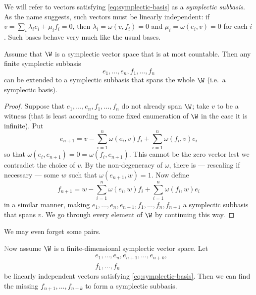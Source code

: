 We will refer to vectors satisfying \eqref{eq:symplectic-basis} as a \emph{symplectic subbasis}. 
As the name suggests, such vectors must be linearly independent:
if $v = \sum_i \lambda_i e_i + \mu_i f_i = 0$, then $\lambda_i = \omega(v, f_i) = 0$ and $\mu_i = \omega(e_i, v) = 0$ for each $i$.
Such bases behave very much like the usual bases.

\begin{proposition}\label{prop:symplectic-basis}
    Assume that $\W$ is a symplectic vector space that is at most countable.
    Then any finite symplectic subbasis \[
        e_1, \ldots, e_n, f_1, \ldots, f_n
    \] 
    can be extended to a symplectic subbasis that spans the whole $\W$ (i.e.~a symplectic basis).
\end{proposition}
\begin{proof}
    Suppose that $e_1, \ldots, e_n, f_1, \ldots, f_n$ do not already span $\W$;
    take $v$ to be a witness (that is least according to some fixed enumeration of $\W$ 
    in the case it is infinite).
    Put
    \[
        e_{n+1} = v - \sum_{i=1}^n \omega(e_i, v) f_i + \sum_{i=1}^n \omega(f_i, v) e_i
    \]
    so that $\omega(e_i, e_{n+1}) = 0 = \omega(f_i, e_{n+1})$.
    This cannot be the zero vector lest we contradict the choice of $v$.
    By the non-degeneracy of $\omega$, there is --- rescaling if necessary 
    --- some $w$ such that $\omega(e_{n+1}, w) = 1$. 
    Now define
    \[
        f_{n+1} = w - \sum_{i=1}^n \omega(e_i, w) f_i + \sum_{i=1}^n \omega(f_i, w) e_i
    \]
    in a similar manner, 
    making $e_1, \ldots, e_n, e_{n+1}, f_1, \ldots, f_n, f_{n+1}$ a symplectic subbasis that spans $v$.
    We go through every element of $\W$ by continuing this way.
\end{proof}

We may even forget some pairs.
\begin{proposition}\label{prop:symplectic-basis-and-a-half}\textcolor{gray}
    Now assume $\W$ is a finite-dimensional symplectic vector space.
    Let 
    \begin{align*} 
        &e_1, \ldots, e_n, e_{n+1}, \ldots, e_{n+k}, \\
        &f_1, \ldots, f_n
    \end{align*}
    be linearly independent vectors satisfying \eqref{eq:symplectic-basis}.
    Then we can find the missing $f_{n+1}, \ldots, f_{n+k}$ to form a symplectic subbasis.
\end{proposition}
\color{black}

